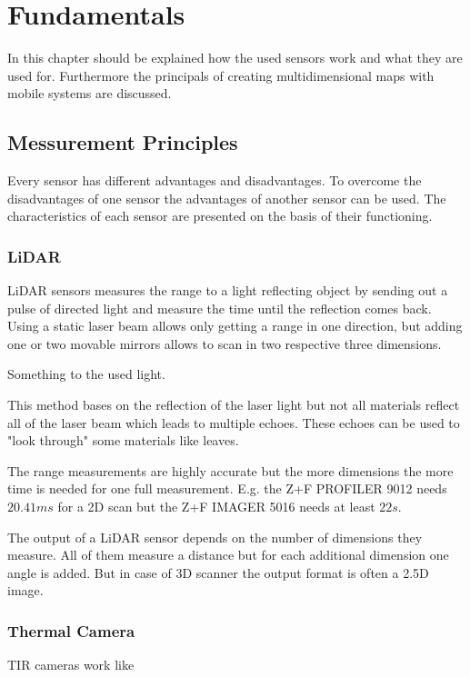 \chapter{Fundamentals}\label{ch:fundamentals}
In this chapter should be explained how the used sensors work and what they are used for.
Furthermore the principals of creating multidimensional maps with mobile systems are discussed.
\section{Messurement Principles}\label{sec:messurementPrinciples}
Every sensor has different advantages and disadvantages.
To overcome the disadvantages of one sensor the advantages of another sensor can be used.
The characteristics of each sensor are presented on the basis of their functioning.
\subsection{LiDAR}\label{ssec:lidar}
\ac{LiDAR} sensors measures the range to a light reflecting object by sending out a pulse of directed light and measure the time until the reflection comes back.
Using a static laser beam allows only getting a range in one direction, but adding one or two movable mirrors allows to scan in two respective three dimensions. 

Something to the used light.

This method bases on the reflection of the laser light but not all materials reflect all of the laser beam which leads to multiple echoes.
These echoes can be used to "look through" some materials like leaves. 

The range measurements are highly accurate but the more dimensions the more time is needed for one full measurement.
E.g. the Z+F PROFILER\circledR{} 9012 needs $20.41\si{ms}$ for a 2D scan but the Z+F IMAGER\circledR{} 5016 needs at least $22\si{s}$.

The output of a \ac{LiDAR} sensor depends on the number of dimensions they measure.
All of them measure a distance but for each additional dimension one angle is added.
But in case of 3D scanner the output format is often a 2.5D image.

\subsection{Thermal Camera}\label{ssec:thermalCamera}
\ac{TIR} cameras work like \cite{Vollmer2017}

